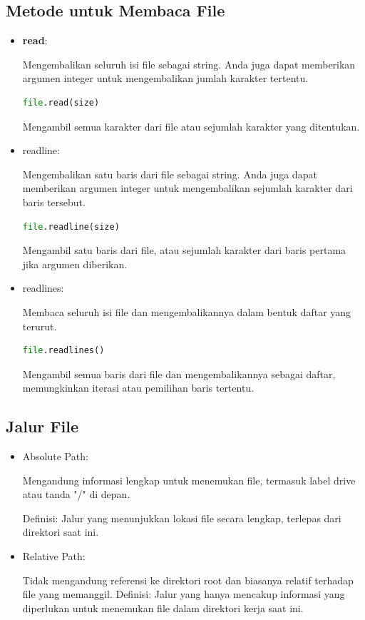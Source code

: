 \documentclass{article}
\begin{document}
\subsection{Metode untuk Membaca File}
\begin{itemize}
    \item \textbf{read}:

          Mengembalikan seluruh isi file sebagai string. Anda juga dapat memberikan argumen integer untuk mengembalikan jumlah karakter tertentu.
          \begin{lstlisting}[language=Python, caption={}, captionpos=b]
file.read(size)
\end{lstlisting}
          Mengambil semua karakter dari file atau sejumlah karakter yang ditentukan.

    \item readline:

          Mengembalikan satu baris dari file sebagai string. Anda juga dapat memberikan argumen integer untuk mengembalikan sejumlah karakter dari baris tersebut.
          \begin{lstlisting}[language=Python, caption={}, captionpos=b]
file.readline(size)
\end{lstlisting}
          Mengambil satu baris dari file, atau sejumlah karakter dari baris pertama jika argumen diberikan.

    \item readlines:

          Membaca seluruh isi file dan mengembalikannya dalam bentuk daftar yang terurut.
          \begin{lstlisting}[language=Python, caption={}, captionpos=b]
file.readlines()
\end{lstlisting}
          Mengambil semua baris dari file dan mengembalikannya sebagai daftar, memungkinkan iterasi atau pemilihan baris tertentu.

\end{itemize}

\subsection{Jalur File}
\begin{itemize}
    \item Absolute Path:

          Mengandung informasi lengkap untuk menemukan file, termasuk label drive atau tanda "/" di depan.

          Definisi: Jalur yang menunjukkan lokasi file secara lengkap, terlepas dari direktori saat ini.

    \item Relative Path:

          Tidak mengandung referensi ke direktori root dan biasanya relatif terhadap file yang memanggil.
          Definisi: Jalur yang hanya mencakup informasi yang diperlukan untuk menemukan file dalam direktori kerja saat ini.
\end{itemize}
\end{document}
